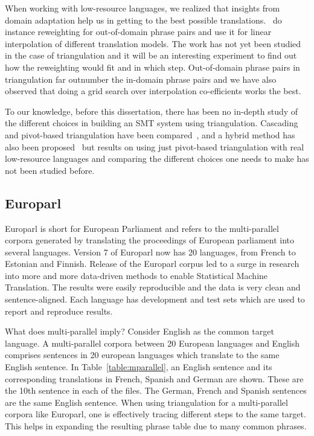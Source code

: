   When working with low-resource languages, we realized that insights from domain adaptation help us in getting to the best possible translations.~\cite{Foster:07} do instance reweighting for out-of-domain phrase pairs and use it for linear interpolation of different translation models. The work has not yet been studied in the case of triangulation and it will be an interesting experiment to find out how the reweighting would fit and in which step. Out-of-domain phrase pairs in triangulation far outnumber the in-domain phrase pairs and we have also observed that doing a grid search over interpolation co-efficients works the best. 


 To our knowledge, before this dissertation, there has been no in-depth study of the different choices in building an SMT system using triangulation. Cascading and pivot-based triangulation have been compared~\cite{Utiyama:07,Gispert:06}, and a hybrid method has also been proposed~\cite{Wu:09} but results on using just pivot-based triangulation with real low-resource languages and comparing the different choices one needs to make has not been studied before. 
\subsection{Europarl}
Europarl is short for European Parliament and refers to the multi-parallel corpora generated by translating the proceedings of European parliament into several languages. Version 7 of Europarl now has 20 languages, from French to Estonian and Finnish. Release of the Europarl corpus led to a surge in research into more and more data-driven methods to enable Statistical Machine Translation. The results were easily reproducible and the data is very clean and sentence-aligned. Each language has development and test sets which are used to report and reproduce results. 

What does multi-parallel imply? Consider English as the common target language. A multi-parallel corpora between 20 European languages and English comprises sentences in 20 european languages which translate to the same English sentence. In Table~\ref{table:mparallel}, an English sentence and its corresponding translations in French, Spanish and German are shown. These are the 10th sentence in each of the files. The German, French and Spanish sentences are the same English sentence. When using triangulation for a multi-parallel corpora like Europarl, one is effectively tracing different steps to the same target. This helps in expanding the resulting phrase table due to many common phrases. 

